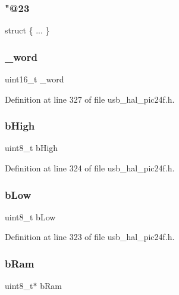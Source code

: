\subsubsection{\texorpdfstring{"@23}{@23}}
{\footnotesize\ttfamily struct \{ ... \} }

\mbox{\label{union___p_o_i_n_t_e_r_a957c357acebf129016c23a180c55a138}} 
\subsubsection{\texorpdfstring{\_word}{\_word}}
{\footnotesize\ttfamily uint16\+\_\+t \+\_\+word}



Definition at line 327 of file usb\+\_\+hal\+\_\+pic24f.\+h.

\mbox{\label{union___p_o_i_n_t_e_r_a9415d74951bbdb3ae28bc33b5db7d1e2}} 
\subsubsection{\texorpdfstring{bHigh}{bHigh}}
{\footnotesize\ttfamily uint8\+\_\+t b\+High}



Definition at line 324 of file usb\+\_\+hal\+\_\+pic24f.\+h.

\mbox{\label{union___p_o_i_n_t_e_r_a4fd529a929a6e33cb6216934961a8cf0}} 
\subsubsection{\texorpdfstring{bLow}{bLow}}
{\footnotesize\ttfamily uint8\+\_\+t b\+Low}



Definition at line 323 of file usb\+\_\+hal\+\_\+pic24f.\+h.

\mbox{\label{union___p_o_i_n_t_e_r_ade44ba3aaf3f950f4c95a2eae3c52266}} 
\subsubsection{\texorpdfstring{bRam}{bRam}}
{\footnotesize\ttfamily uint8\+\_\+t$\ast$ b\+Ram}



